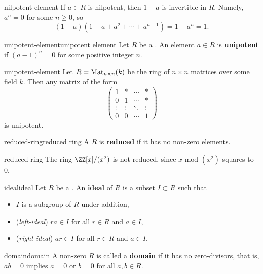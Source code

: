 \begin{example}{nilpotent-element}
    If $a \in R$ is nilpotent, then $1 - a$ is invertible in $R$. Namely, $a^n = 0$ for some $n \ge 0$, so
    \[ (1 - a) (1 + a + a^2 + \cdots + a^{n - 1}) = 1 - a^n = 1 . \]
\end{example}

\begin{topic}{unipotent-element}{unipotent element}
    Let $R$ be a . An element $a \in R$ is \textbf{unipotent} if $(a - 1)^n = 0$ for some positive integer $n$.
\end{topic}

\begin{example}{unipotent-element}
    Let $R = \textup{Mat}_{n \times n}(k)$ be the ring of $n \times n$ matrices over some field $k$. Then any matrix of the form
    \[ \begin{pmatrix} 1 & * & \cdots & * \\ 0 & 1 & \cdots & * \\ \vdots & \vdots & \ddots & \vdots \\ 0 & 0 & \cdots & 1 \end{pmatrix} \]
    is unipotent.
\end{example}

\begin{topic}{reduced-ring}{reduced ring}
    A  $R$ is \textbf{reduced} if it has no non-zero  elements.
\end{topic}

\begin{example}{reduced-ring}
    The ring $\ZZ[x] / (x^2)$ is not reduced, since $x \text{ mod } (x^2)$ squares to $0$.
\end{example}

\begin{topic}{ideal}{ideal}
    Let $R$ be a . An \textbf{ideal} of $R$ is a subset $I \subset R$ such that
    \begin{itemize}
        \item $I$ is a subgroup of $R$ under addition,
        \item (\textit{left-ideal}) $ra \in I$  for all $r \in R$ and $a \in I$,
        \item (\textit{right-ideal}) $ar \in I$ for all $r \in R$ and $a \in I$.
    \end{itemize}
\end{topic}

\begin{topic}{domain}{domain}
    A non-zero  $R$ is called a \textbf{domain} if it has no zero-divisors, that is, $ab = 0$ implies $a = 0$ or $b = 0$ for all $a, b \in R$.
\end{topic}

